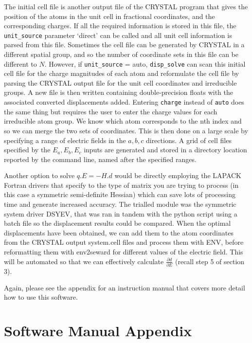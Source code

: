 \documentclass[10pt]{article}
\begin{document}
The initial cell file is another output file of the CRYSTAL program that gives the position of the atoms in the unit cell in fractional coordinates, and the corresponding charges. If all the required information is stored in this file, the \texttt{unit\_source} parameter `direct' can be called and all unit cell information is parsed from this file. Sometimes the cell file can be generated by CRYSTAL in a different spatial group, and so the number of coordinate sets in this file can be different to $N$. However, if \texttt{unit\_source} = auto, \texttt{disp\_solve} can scan this initial cell file for the charge magnitudes of each atom and reformulate the cell file by parsing the CRYSTAL output file for the unit cell coordinates and irreducible groups. A new file is then written containing double-precision floats with the associated converted displacements added. Entering \texttt{charge} instead of \texttt{auto} does the same thing but requires the user to enter the charge values for each irreducible atom group. We know which atom corresponds to the nth index and so we can merge the two sets of coordinates. This is then done on a large scale by specifying a range of electric fields in the $a,b,c$ directions. A grid of cell files specified by the $E_a,E_b,E_c$ inputs are generated and stored in a directory location reported by the command line, named after the specified ranges. 

Another option to solve $q.E = -H.d$ would be directly employing the LAPACK Fortran drivers that specify to the type of matrix you are trying to process (in this case a symmetric semi-definite Hessian) which can save lots of processing time and generate increased accuracy. The trialled module was the symmetric system driver DSYEV, that was ran in tandem with the python script using a batch file so the displacement results could be compared. When the optimal displacements have been obtained, we can add them to the atom coordinates from the CRYSTAL output system.cell files and process them with ENV, before reformatting them with env2seward for different values of the electric field. This will be automated so that we can effectively calculate $\frac{\partial d}{\partial E}$ (recall step 5 of section 3).

Again, please see the appendix for an instruction manual that covers more detail how to use this software.

\newpage
\section*{Software Manual Appendix}




\end{document}

